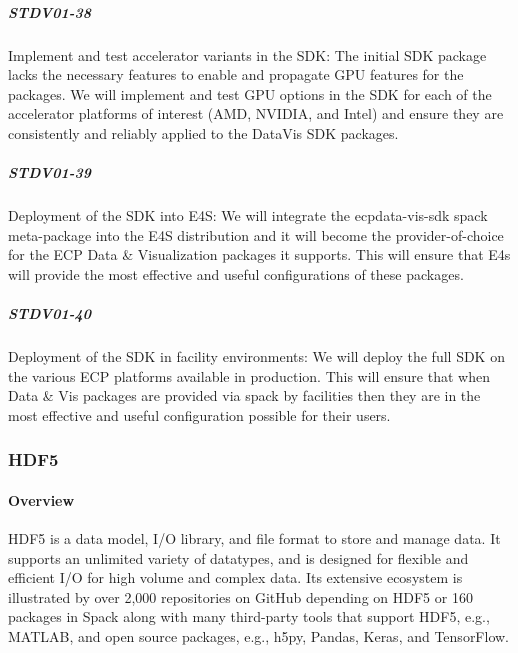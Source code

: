 \subparagraph{STDV01-38}

Implement and test accelerator variants in the SDK: The initial SDK package lacks the necessary features to enable and propagate GPU features for the packages.  We will implement and test GPU options in the SDK for each of the accelerator platforms of interest (AMD, NVIDIA, and Intel) and ensure they are consistently and reliably applied to the DataVis SDK packages.

\subparagraph{STDV01-39}

Deployment of the SDK into E4S: We will integrate the ecpdata-vis-sdk spack meta-package into the E4S distribution and it will become the provider-of-choice for the ECP Data \& Visualization packages it supports.  This will ensure that E4s will provide the most effective and useful configurations of these packages.

\subparagraph{STDV01-40}

Deployment of the SDK in facility environments: We will deploy the full SDK on the various ECP platforms available in production.  This will ensure that when Data \& Vis packages are provided via spack by facilities then they are in the most effective and useful configuration possible for their users.

\subsubsection*{HDF5}

\paragraph{Overview}
HDF5 is a data model, I/O library, and file format to store and manage data. It supports an unlimited variety of datatypes, and is designed for flexible and efficient I/O for high volume and complex data. Its extensive ecosystem is illustrated by over 2,000 repositories on GitHub depending on HDF5 or 160 packages in Spack along with many third-party tools that support HDF5, e.g., MATLAB, and open source packages, e.g., h5py, Pandas, Keras, and TensorFlow. 

